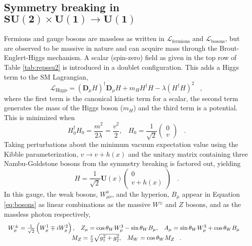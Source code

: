 \subsection[Symmetry breaking in $SU(2)\times U(1)\rightarrow U(1)$]
{Symmetry breaking in $\mathbf{SU(2)\times U(1)\rightarrow U(1)}$}
 \label{sec:higgsmech}
 Fermions and gauge bosons are massless as written in 
  $\mathcal{L}_{\mathrm{fermions}}$ and 
  $\mathcal{L}_{\mathrm{bosons}}$,
  but are observed to be massive in nature
  and can acquire mass through the Brout-Englert-Higgs
  mechanism. 
 A scalar (spin-zero) field %
  as given in the top row of Table \ref{tab:repssu2}
  is introduced in a  
  doublet configuration.
 This adds a Higgs term
  to the SM Lagrangian,
\begin{equation}\label{eq:higgslagrange}
 \mathcal{L}_{\mathrm{Higgs}} = 
 \left (\boldsymbol{D}_\mu H\right )^\dagger  \boldsymbol{D}_\mu H +
 m_HH^\dagger H -
 \lambda \left (H^\dagger H \right )^2\;\;\;,
\end{equation}
  where the first term is the canonical kinetic
  term for a scalar,
  the second term generates the mass of the Higgs boson ($m_H$)
  and the third term is a potential.
 This is minimized when 
\begin{equation}
 H_0^\dagger H_0 = \frac{m^2}{2\lambda}=\frac{v^2}{2}, \;\;\; 
 H_0 = \frac{1}{\sqrt{2}}\begin{pmatrix}0 \\ v \end{pmatrix}\;\;\;.
\end{equation}
 Taking perturbations 
  about the minimum vacuum expectation value
  using the Kibble parameterization, $v\rightarrow v+h(x)$ and
  the unitary matrix containing three
  Nambu-Goldstone bosons from the symmetry
  breaking is factored out, yielding
\begin{equation}
 H=\frac{1}{\sqrt{2}}\boldsymbol{U}(x)\begin{pmatrix} 0 \\ v+h(x) \end{pmatrix}\;\;\;.
\end{equation}
 In this gauge, the weak bosons, $W^a_{\mu\nu}$,
  and the hyperion, $B_\mu$ appear in Equation \ref{eq:bosons} as linear combinations
  as the massive $W^\pm$ and $Z$ bosons, and as the massless photon respectively,
\begin{equation}\label{eq:bosons}
\begin{tabular}{c}
 $W^\pm_\mu = \frac{1}{\sqrt{2}}\left (W^1_\mu \mp iW^2_\mu \right),\;\;\;
 Z_\mu  = \cos \theta_W W^3_\mu - \sin \theta_W B_\mu,\;\;\;
 A_\mu  = \sin \theta_W W^3_\mu + \cos \theta_W B_\mu\;\;\; $ 
\\
 $M_Z = \frac{v}{2}\sqrt{g_1^2 + g_2^2}, \;\;\; M_W = \cos\theta_W M_Z\;\;\; $.
\end{tabular}
\end{equation}  
